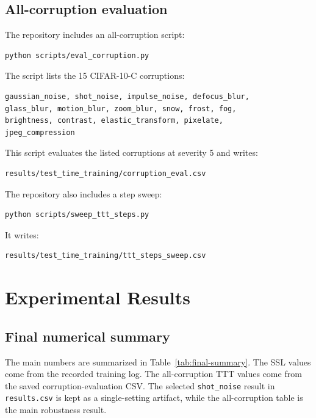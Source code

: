 \documentclass[a4paper,11pt]{article}
\begin{document}
\subsection{All-corruption evaluation}

The repository includes an all-corruption script:
\begin{lstlisting}
python scripts/eval_corruption.py
\end{lstlisting}
The script lists the 15 CIFAR-10-C corruptions:
\begin{lstlisting}
gaussian_noise, shot_noise, impulse_noise, defocus_blur,
glass_blur, motion_blur, zoom_blur, snow, frost, fog,
brightness, contrast, elastic_transform, pixelate,
jpeg_compression
\end{lstlisting}
This script evaluates the listed corruptions at severity 5 and writes:
\begin{lstlisting}
results/test_time_training/corruption_eval.csv
\end{lstlisting}
The repository also includes a step sweep:
\begin{lstlisting}
python scripts/sweep_ttt_steps.py
\end{lstlisting}
It writes:
\begin{lstlisting}
results/test_time_training/ttt_steps_sweep.csv
\end{lstlisting}

\section{Experimental Results}

\subsection{Final numerical summary}

The main numbers are summarized in Table~\ref{tab:final-summary}. The SSL values come from the recorded training log. The all-corruption TTT values come from the saved corruption-evaluation CSV. The selected \texttt{shot\_noise} result in \texttt{results.csv} is kept as a single-setting artifact, while the all-corruption table is the main robustness result.
\end{document}
